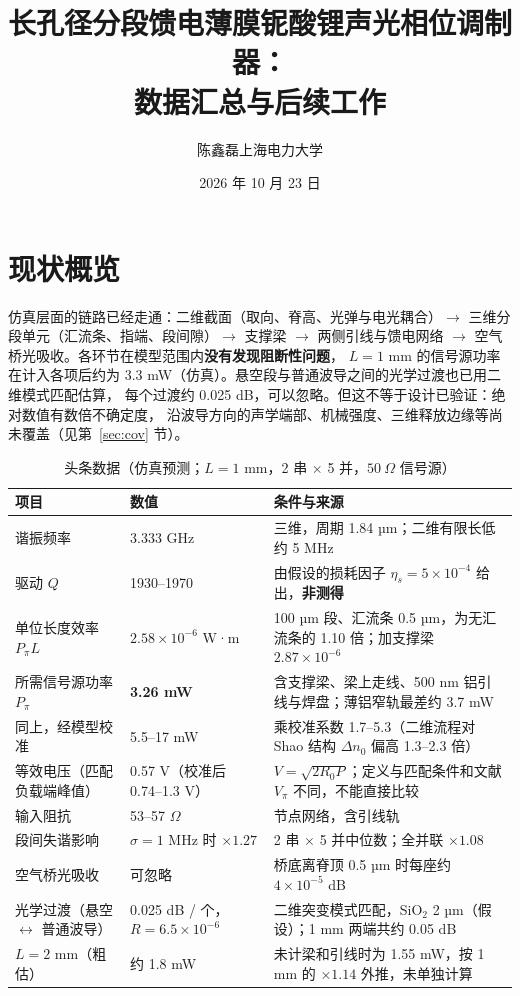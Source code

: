 \documentclass[10pt,a4paper]{article}
\title{\textbf{长孔径分段馈电薄膜铌酸锂声光相位调制器：\\数据汇总与后续工作}}
\author{陈鑫磊\quad 上海电力大学}
\date{2026 年 10 月 23 日}
\newcommand{\dn}{\Delta n_0}
\begin{document}
\maketitle

\noindent{}

\section{现状概览}
仿真层面的链路已经走通：二维截面（取向、脊高、光弹与电光耦合）$\rightarrow$ 三维分段单元（汇流条、指端、段间隙）$\rightarrow$
支撑梁 $\rightarrow$ 两侧引线与馈电网络 $\rightarrow$ 空气桥光吸收。各环节在模型范围内\textbf{没有发现阻断性问题}，
$L = 1$ mm 的信号源功率在计入各项后约为 3.3 mW（仿真）。悬空段与普通波导之间的光学过渡也已用二维模式匹配估算，
每个过渡约 0.025 dB，可以忽略。但这不等于设计已验证：绝对数值有数倍不确定度，
沿波导方向的声学端部、机械强度、三维释放边缘等尚未覆盖（见第~\ref{sec:cov} 节）。

\begin{table}[H]
\centering\small
\caption{头条数据（仿真预测；$L = 1$ mm，2 串 $\times$ 5 并，$50\ \Omega$ 信号源）}\label{tab:head}
\begin{tabular}{L{4.4cm}L{3.3cm}L{7.6cm}}
\toprule
项目 & 数值 & 条件与来源 \\
\midrule
谐振频率 & 3.333 GHz & 三维，周期 1.84 µm；二维有限长低约 5 MHz \\
驱动 $Q$ & 1930--1970 & 由假设的损耗因子 $\eta_s = 5\times10^{-4}$ 给出，\textbf{非测得} \\
单位长度效率 $P_\pi L$ & $2.58\times10^{-6}$ W·m & 100 µm 段、汇流条 0.5 µm，为无汇流条的 1.10 倍；加支撑梁 $2.87\times10^{-6}$ \\
所需信号源功率 $P_\pi$ & \textbf{3.26 mW} & 含支撑梁、梁上走线、500 nm 铝引线与焊盘；薄铝窄轨最差约 3.7 mW \\
同上，经模型校准 & 5.5--17 mW & 乘校准系数 1.7--5.3（二维流程对 Shao 结构 $\dn$ 偏高 1.3--2.3 倍） \\
等效电压（匹配负载端峰值） & 0.57 V（校准后 0.74--1.3 V） & $V=\sqrt{2R_0P}$；定义与匹配条件和文献 $V_\pi$ 不同，不能直接比较 \\
输入阻抗 & 53--57 $\Omega$ & 节点网络，含引线轨 \\
段间失谐影响 & $\sigma = 1$ MHz 时 $\times1.27$ & 2 串 $\times$ 5 并中位数；全并联 $\times1.08$ \\
空气桥光吸收 & 可忽略 & 桥底离脊顶 0.5 µm 时每座约 $4\times10^{-5}$ dB \\
光学过渡（悬空 $\leftrightarrow$ 普通波导） & 0.025 dB / 个，$R = 6.5\times10^{-6}$ & 二维突变模式匹配，SiO$_2$ 2 µm（假设）；1 mm 两端共约 0.05 dB \\
$L = 2$ mm（粗估） & 约 1.8 mW & 未计梁和引线时为 1.55 mW，按 1 mm 的 $\times1.14$ 外推，未单独计算 \\
\bottomrule
\end{tabular}
\end{table}
\end{document}
